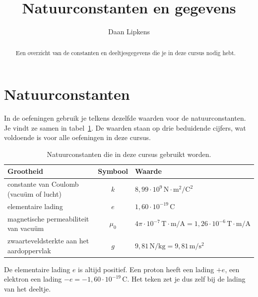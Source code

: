 \documentclass{ximera}
\title{Natuurconstanten en gegevens}
\author{Daan Lipkens}
\begin{document}
\begin{abstract}
    Een overzicht van de constanten en deeltjesgegevens die je in deze cursus nodig hebt.
\end{abstract}
\maketitle
\label{hoofdstuk:constanten}

\section{Natuurconstanten}\label{sec:natuurconstanten}
In de oefeningen gebruik je telkens dezelfde waarden voor de natuurconstanten. Je vindt ze samen in tabel~\ref{tab:natuurconstanten}. De waarden staan op drie beduidende cijfers, wat voldoende is voor alle oefeningen in deze cursus.

\begin{table}[ht!]
    \begin{center}
        \begin{tabular}{l c l}
            \toprule
            Grootheid & Symbool & Waarde \\
            \midrule
            constante van Coulomb (vacuüm of lucht) & $k$ & $8{,}99 \cdot 10^{9} \, \mathrm{N \cdot m^2/C^2}$ \\
            elementaire lading & $e$ & $1{,}60 \cdot 10^{-19} \, \mathrm{C}$ \\
            magnetische permeabiliteit van vacuüm & $\mu_0$ & $4\pi \cdot 10^{-7} \, \mathrm{T \cdot m/A} = 1{,}26 \cdot 10^{-6} \, \mathrm{T \cdot m/A}$ \\
            zwaarteveldsterkte aan het aardoppervlak & $g$ & $9{,}81 \, \mathrm{N/kg}=9{,}81 \, \mathrm{m/s^2}$ \\
            \bottomrule
        \end{tabular}
    \end{center}
    \caption{Natuurconstanten die in deze cursus gebruikt worden.}
    \label{tab:natuurconstanten}
\end{table}

\begin{remark}[title={Elementaire lading en teken}]\nl
    De elementaire lading $e$ is altijd positief. Een proton heeft een lading $+e$, een elektron een lading $-e = -1{,}60 \cdot 10^{-19} \, \mathrm{C}$. Het teken zet je dus zelf bij de lading van het deeltje.
\end{remark}
\end{document}
